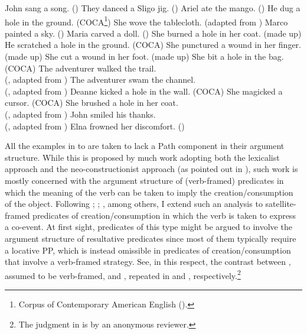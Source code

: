 \documentclass[output=paper,colorlinks,citecolor=brown]{langscibook}
\begin{document}
\ea John sang a song.  \label{sang} \hfill (\citealt[1361]{Truswell2007}) \z
\ea They danced a Sligo jig. \hfill (\citealt[98]{Gallego2012}) \z
\ea Ariel ate the mango. \hfill (\citealt[52]{big:Ramchand2008}) \z
\ea He dug a hole in the ground. \label{dughole}\hfill (COCA\footnote{Corpus of Contemporary American English (\citealt{Davies2008}).})\z
\ea She wove the tablecloth. \label{weave} \hfill (adapted from \citealt[452]{FolliAndHarley2020})\z
\ea Marco painted a sky. \label{paint} \hfill (\citealt[438]{FolliAndHarley2020})\z
\ea Maria carved a doll. \label{carve} \hfill (\citealt[439]{FolliAndHarley2020})\z
\ea She burned a hole in her coat. \hfill (made up)\z
\ea He scratched a hole in the ground. \label{scratch} \hfill (COCA)\z
\ea She punctured a wound in her finger. \label{puncture} \hfill (made up)\z
\ea She cut a wound in her foot. \hfill (made up)\z
\ea She bit a hole in the bag. \hfill (COCA)\z
\ea The adventurer walked the trail. \label{walk} \\ \hfill (\citealt[297]{Mateu2002}, adapted from \citealt[17]{Tenny1994})\z
\ea The adventurer swam the channel. \label{swim} \\ \hfill (\citealt[297]{Mateu2002}, adapted from \citealt[17]{Tenny1994})\z
\ea Deanne kicked a hole in the wall. \label{kick} \hfill (COCA)\z
\ea She magicked a cursor. \label{magickednoPP} \hfill (COCA)\z
\ea She brushed a hole in her coat. \label{brushhole2} \\ \hfill (\citealt[213]{MateuandRigau2002}, adapted from \citealt{LevinAndRapoport1988}%
)\z
\ea John smiled his thanks. \label{Johnsmiled} \\ \hfill (\citealt[255]{Mateu2012}, adapted from \citealt{LevinAndRapoport1988})\z
\ea Elna frowned her discomfort. \label{Elnafrowned}\hfill (\citealt[35]{AcedoMatellan&Kwapiszewski2021})
\z


\noindent All the examples in  to  are taken to lack a Path component in their argument structure. While this is proposed by much work adopting both the lexicalist approach and the neo-constructionist approach (as pointed out in ), such work is mostly concerned with the argument structure of (verb-framed) predicates in which the meaning of the verb can be taken to imply the creation/consumption of the object. Following \citet{Mateu2012}; \citet{Acedo-Matellan2016}; \citet{FolliAndHarley2020}, among others, I extend such an analysis to satellite-framed predicates of creation/consumption in which the verb is taken to express a co-event. At first sight, predicates of this type might be argued to involve the argument structure of resultative predicates since most of them typically require a locative PP, which is instead omissible in predicates of creation/consumption that involve a verb-framed strategy. See, in this respect, the contrast between , assumed to be verb-framed, and , repeated in  and , respectively.\footnote{The judgment in  is by an anonymous reviewer.}
\end{document}
